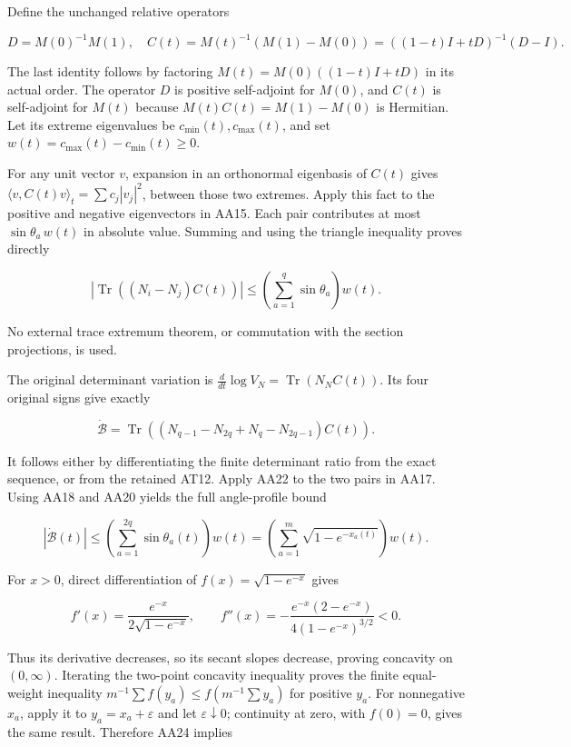 Define the unchanged relative operators

\[
D=M(0)^{-1}M(1),\quad
C(t)=M(t)^{-1}(M(1)-M(0))
=((1-t)I+tD)^{-1}(D-I).
\tag{AA21}
\]

The last identity follows by factoring \(M(t)=M(0)((1-t)I+tD)\) in its actual order. The operator \(D\) is positive self-adjoint for \(M(0)\), and \(C(t)\) is self-adjoint for \(M(t)\) because \(M(t)C(t)=M(1)-M(0)\) is Hermitian. Let its extreme eigenvalues be \(c_{\min}(t),c_{\max}(t)\), and set \(w(t)=c_{\max}(t)-c_{\min}(t)\ge0\).

For any unit vector \(v\), expansion in an orthonormal eigenbasis of \(C(t)\) gives \(\langle v,C(t)v\rangle_t=\sum c_j|v_j|^2\), between those two extremes. Apply this fact to the positive and negative eigenvectors in AA15. Each pair contributes at most \(\sin\theta_a\,w(t)\) in absolute value. Summing and using the triangle inequality proves directly

\[
|\operatorname{Tr}((N_i-N_j)C(t))|
\le\left(\sum_{a=1}^q\sin\theta_a\right)w(t).
\tag{AA22}
\]

No external trace extremum theorem, or commutation with the section projections, is used.

The original determinant variation is \(\frac d{dt}\log V_N=\operatorname{Tr}(N_N C(t))\). Its four original signs give exactly

\[
\dot{\mathcal B}
=\operatorname{Tr}((N_{q-1}-N_{2q}+N_q-N_{2q-1})C(t)).
\tag{AA23}
\]

It follows either by differentiating the finite determinant ratio from the exact sequence, or from the retained AT12. Apply AA22 to the two pairs in AA17. Using AA18 and AA20 yields the full angle-profile bound

\[
|\dot{\mathcal B}(t)|
\le\left(\sum_{a=1}^{2q}\sin\theta_a(t)\right)w(t)
=\left(\sum_{a=1}^{m}\sqrt{1-e^{-x_a(t)}}\right)w(t).
\tag{AA24}
\]

For \(x>0\), direct differentiation of \(f(x)=\sqrt{1-e^{-x}}\) gives

\[
f'(x)=\frac{e^{-x}}{2\sqrt{1-e^{-x}}},\qquad
f''(x)=-\frac{e^{-x}(2-e^{-x})}{4(1-e^{-x})^{3/2}}<0.
\tag{AA25}
\]

Thus its derivative decreases, so its secant slopes decrease, proving concavity on \((0,\infty)\). Iterating the two-point concavity inequality proves the finite equal-weight inequality \(m^{-1}\sum f(y_a)\le f(m^{-1}\sum y_a)\) for positive \(y_a\). For nonnegative \(x_a\), apply it to \(y_a=x_a+\varepsilon\) and let \(\varepsilon\downarrow0\); continuity at zero, with \(f(0)=0\), gives the same result. Therefore AA24 implies

